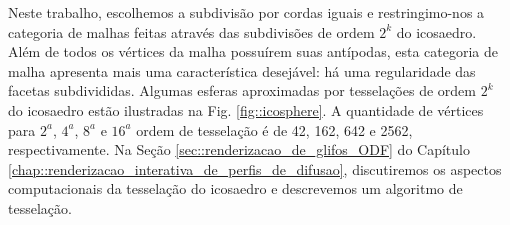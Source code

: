 \documentclass[
    12pt,                %
    oneside,            %
    a4paper,            %
    english,            %
    french,                %
    spanish,            %
    brazil                %
    ]{abntex2}
\begin{document}


Neste trabalho, escolhemos a subdivisão por cordas iguais e restringimo-nos a categoria de malhas feitas através das subdivisões de ordem $2^k$ do icosaedro. Além de todos os vértices da malha possuírem suas antípodas, esta categoria de malha apresenta mais uma característica desejável: há uma regularidade das facetas subdivididas. Algumas esferas aproximadas por tesselações de ordem $2^k$ do icosaedro estão ilustradas na Fig. \ref{fig::icosphere}. A quantidade de vértices para $2^a$, $4^a$, $8^a$ e $16^a$ ordem de tesselação é de 42, 162, 642 e 2562, respectivamente. Na Seção \ref{sec::renderizacao_de_glifos_ODF} do Capítulo \ref{chap::renderizacao_interativa_de_perfis_de_difusao}, discutiremos os aspectos computacionais da tesselação do icosaedro e descrevemos um algoritmo de tesselação.
\end{document}
